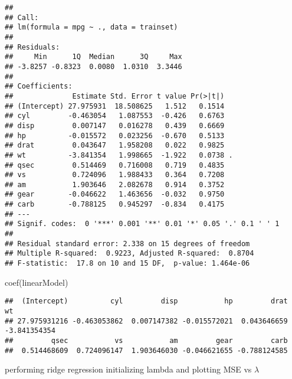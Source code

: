 \documentclass[
]{article}
\newenvironment{Shaded}{\begin{snugshade}}{\end{snugshade}}
\newcommand{\DecValTok}[1]{\textcolor[rgb]{0.00,0.00,0.81}{#1}}
\newcommand{\FunctionTok}[1]{\textcolor[rgb]{0.00,0.00,0.00}{#1}}
\newcommand{\NormalTok}[1]{#1}
\newcommand{\OtherTok}[1]{\textcolor[rgb]{0.56,0.35,0.01}{#1}}
\newcommand{\SpecialCharTok}[1]{\textcolor[rgb]{0.00,0.00,0.00}{#1}}
\begin{document}
\begin{verbatim}
## 
## Call:
## lm(formula = mpg ~ ., data = trainset)
## 
## Residuals:
##     Min      1Q  Median      3Q     Max 
## -3.8257 -0.8323  0.0080  1.0310  3.3446 
## 
## Coefficients:
##              Estimate Std. Error t value Pr(>|t|)  
## (Intercept) 27.975931  18.508625   1.512   0.1514  
## cyl         -0.463054   1.087553  -0.426   0.6763  
## disp         0.007147   0.016278   0.439   0.6669  
## hp          -0.015572   0.023256  -0.670   0.5133  
## drat         0.043647   1.958208   0.022   0.9825  
## wt          -3.841354   1.998665  -1.922   0.0738 .
## qsec         0.514469   0.716008   0.719   0.4835  
## vs           0.724096   1.988433   0.364   0.7208  
## am           1.903646   2.082678   0.914   0.3752  
## gear        -0.046622   1.463656  -0.032   0.9750  
## carb        -0.788125   0.945297  -0.834   0.4175  
## ---
## Signif. codes:  0 '***' 0.001 '**' 0.01 '*' 0.05 '.' 0.1 ' ' 1
## 
## Residual standard error: 2.338 on 15 degrees of freedom
## Multiple R-squared:  0.9223, Adjusted R-squared:  0.8704 
## F-statistic:  17.8 on 10 and 15 DF,  p-value: 1.464e-06
\end{verbatim}

\begin{Shaded}
\begin{Highlighting}[]
\FunctionTok{coef}\NormalTok{(linearModel)}
\end{Highlighting}
\end{Shaded}

\begin{verbatim}
##  (Intercept)          cyl         disp           hp         drat           wt 
## 27.975931216 -0.463053862  0.007147382 -0.015572021  0.043646659 -3.841354354 
##         qsec           vs           am         gear         carb 
##  0.514468609  0.724096147  1.903646030 -0.046621655 -0.788124585
\end{verbatim}

performing ridge regression initializing lambda and plotting MSE vs
\(\lambda\)

\begin{Shaded}
\end{Shaded}
\end{document}
